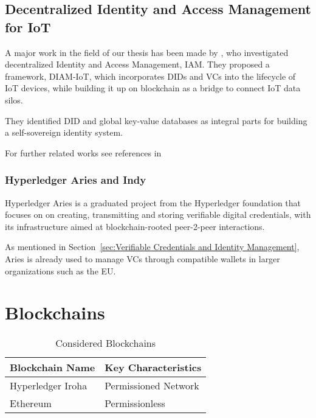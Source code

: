 \subsection{Decentralized Identity and Access Management for IoT} %
\label{sub:Decentralized Identity and Access Management for IoT}
A major work in the field of our thesis has been made by \cite{diam-iot-2020}, who investigated decentralized Identity
and Access Management, IAM. They proposed a framework, DIAM-IoT, which incorporates DIDs and VCs into the lifecycle of
IoT devices, while building it up on blockchain as a bridge to connect IoT data silos.

They identified DID and global key-value databases as integral parts for building a self-sovereign identity system.

For further related works see references in \cite{diam-iot-2020}



\subsubsection{Hyperledger Aries and Indy} %
\label{sec:Hyperledger Aries}

Hyperledger Aries is a graduated project from the Hyperledger foundation that focuses on on creating, transmitting and
storing verifiable digital credentials, with its infrastructure aimed at blockchain-rooted peer-2-peer interactions.

As mentioned in Section~\ref{sec:Verifiable Credentials and Identity Management}, Aries is already used to manage VCs
through compatible wallets in larger organizations such as the EU.


\section{Blockchains} %
\label{sec:Blockchains}
\begin{table}
	\caption{Considered Blockchains}
	\label{tab:Considered Blockchains}
	\begin{center}
		\begin{tabular}[c]{|l|l|}
			\hline
			\textbf{Blockchain Name}                  & Key Characteristics  \\
			\hline
			Hyperledger Iroha \cite{hyperledger:wiki} & Permissioned Network \\
			\hline
			Ethereum                                  & Permissionless       \\
			\hline
		\end{tabular}
	\end{center}
\end{table}

